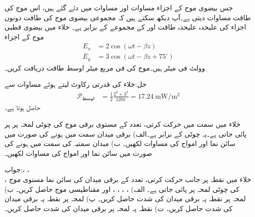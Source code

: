 جس بیضوی موج کے اجزاء مساوات  اور مساوات  میں دئے گئے ہیں، اس موج کی طاقت مساوات  دیتی ہے۔آپ دیکھ سکتے ہیں کہ مجموعی بیضوی موج کی طاقت دونوں اجزاء کی علیحدہ علیحدہ طاقت  اور  کے مجموعے کے برابر ہے۔
خلاء میں بیضوی قطبی موج کے اجزاء
\begin{align*}
E_x&=2 \cos (\omega t -\beta z)\\
E_y&=3 \cos (\omega t -\beta z+75^{\circ})
\end{align*}
وولٹ فی میٹر ہیں۔موج کی فی مربع میٹر اوسط طاقت دریافت کریں۔

حل:خلاء کی قدرتی رکاوٹ  لیتے ہوئے مساوات 
سے
\begin{align*}
\mathscr{P}_{\text{اوسط}}&=\frac{1}{2} \frac{2^2+3^2}{120\pi}=\SI{17.24}{\milli \watt \per \meter \squared}
\end{align*}
حاصل ہوتا ہے۔

\newpage
{}

خلاء میں  سمت میں حرکت کرتی،  تعدد  کے مستوی برقی موج  کی  چوٹی لمحہ  پر   پر پائی جاتی ہے۔یہ چوٹی  کے برابر ہے۔الف) برقی میدان  سمت میں ہونے کی صورت میں سائن نما   اور  امواج کی مساوات لکھیں۔ ب) میدان سمتیہ  کی سمت میں ہونے کی صورت
 میں سائن نما   اور   امواج کی مساوات لکھیں۔

جواب:، ،\\ ،  
خلاء میں  نقطہ  پر  جانب حرکت کرتی،  تعدد کے برقی میدان کی سائن نما مستوی موج کی چوٹی لمحہ  پر  پائی جاتی ہے۔ الف) ، ، ، ،  اور مقناطیسی موج  حاصل کریں۔  ب) لمحہ  پر نقطہ  پہ برقی میدان کی شدت  حاصل کریں۔ پ) لمحہ  پر نقطہ  پہ برقی میدان کی شدت  حاصل کریں۔ ت) نقطہ  پہ لمحہ  پر برقی میدان کی شدت حاصل کریں۔ 

